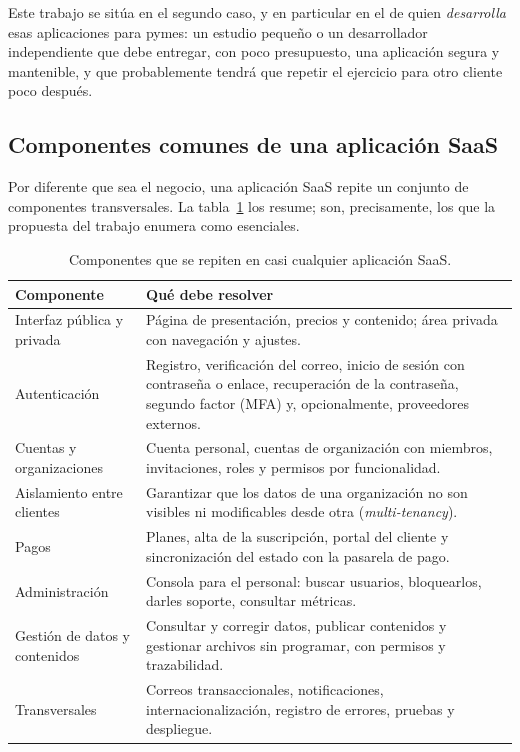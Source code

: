 Este trabajo se sitúa en el segundo caso, y en particular en el de quien
\emph{desarrolla} esas aplicaciones para pymes: un estudio pequeño o un
desarrollador independiente que debe entregar, con poco presupuesto, una
aplicación segura y mantenible, y que probablemente tendrá que repetir el
ejercicio para otro cliente poco después.

\subsection{Componentes comunes de una aplicación SaaS}
\label{sec:ctx-componentes}

Por diferente que sea el negocio, una aplicación SaaS repite un conjunto de
componentes transversales. La tabla~\ref{tab:ctx-componentes} los resume; son,
precisamente, los que la propuesta del trabajo enumera como esenciales.

\begin{table}[htbp]
  \centering
  \small
  \caption{Componentes que se repiten en casi cualquier aplicación SaaS.}
  \label{tab:ctx-componentes}
  \begin{tabularx}{\textwidth}{@{}>{\raggedright\arraybackslash}p{3.6cm}X@{}}
    \toprule
    \textbf{Componente} & \textbf{Qué debe resolver} \\
    \midrule
    Interfaz pública y privada & Página de presentación, precios y contenido; área privada con navegación y ajustes. \\
    Autenticación & Registro, verificación del correo, inicio de sesión con contraseña o enlace, recuperación de la contraseña, segundo factor (MFA) y, opcionalmente, proveedores externos. \\
    Cuentas y organizaciones & Cuenta personal, cuentas de organización con miembros, invitaciones, roles y permisos por funcionalidad. \\
    Aislamiento entre clientes & Garantizar que los datos de una organización no son visibles ni modificables desde otra (\textit{multi-tenancy}). \\
    Pagos & Planes, alta de la suscripción, portal del cliente y sincronización del estado con la pasarela de pago. \\
    Administración & Consola para el personal: buscar usuarios, bloquearlos, darles soporte, consultar métricas. \\
    Gestión de datos y contenidos & Consultar y corregir datos, publicar contenidos y gestionar archivos sin programar, con permisos y trazabilidad. \\
    Transversales & Correos transaccionales, notificaciones, internacionalización, registro de errores, pruebas y despliegue. \\
    \bottomrule
  \end{tabularx}
\end{table}

